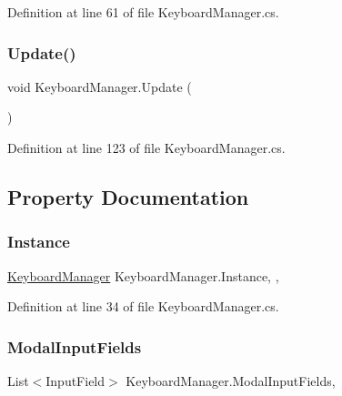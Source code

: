 Definition at line 61 of file Keyboard\+Manager.\+cs.

\mbox{\label{class_keyboard_manager_aa462926c6558f1939ed876f93c1ba777}} 
\subsubsection{\texorpdfstring{Update()}{Update()}}
{\footnotesize\ttfamily void Keyboard\+Manager.\+Update (\begin{DoxyParamCaption}{ }\end{DoxyParamCaption})}



Definition at line 123 of file Keyboard\+Manager.\+cs.



\subsection{Property Documentation}
\mbox{\label{class_keyboard_manager_aa3ba01f0ebce34e50563d2fe607f7bbd}} 
\subsubsection{\texorpdfstring{Instance}{Instance}}
{\footnotesize\ttfamily \hyperlink{class_keyboard_manager}{Keyboard\+Manager} Keyboard\+Manager.\+Instance\hspace{0.3cm}{\ttfamily [static]}, {\ttfamily [get]}, {\ttfamily [set]}}



Definition at line 34 of file Keyboard\+Manager.\+cs.

\mbox{\label{class_keyboard_manager_a98ebd09a48b0b924ad13e18b6dfeb969}} 
\subsubsection{\texorpdfstring{Modal\+Input\+Fields}{ModalInputFields}}
{\footnotesize\ttfamily List$<$Input\+Field$>$ Keyboard\+Manager.\+Modal\+Input\+Fields\hspace{0.3cm}{\ttfamily [get]}, {\ttfamily [set]}}



